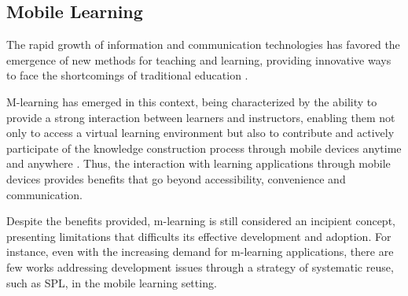\subsection{Mobile Learning}


The rapid growth of information and communication technologies has favored the emergence of new methods for teaching and learning, providing innovative ways to face the shortcomings of traditional education \cite{west12}. 

M-learning has emerged in this context, being characterized by the ability to provide a strong interaction between learners and instructors, enabling them not only to access a virtual learning environment but also to contribute and actively participate of the knowledge construction process through mobile devices anytime and anywhere \cite{kukulska05}. Thus, the interaction with learning applications through mobile devices provides benefits that go beyond accessibility, convenience and communication.




Despite the benefits provided, m-learning is still considered an incipient concept, presenting limitations that difficults its effective development and adoption. For instance, even with the increasing demand for m-learning applications, there are few works addressing development issues through a strategy of systematic reuse, such as SPL, in the mobile learning setting.  

